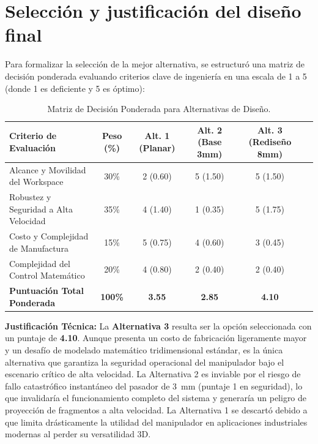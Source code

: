 \documentclass[11pt,a4paper]{article}
\begin{document}
\section{Selección y justificación del diseño final}
Para formalizar la selección de la mejor alternativa, se estructuró una matriz de decisión ponderada evaluando criterios clave de ingeniería en una escala de 1 a 5 (donde 1 es deficiente y 5 es óptimo):
\begin{table}[H]
    \centering
    \caption{Matriz de Decisión Ponderada para Alternativas de Diseño.}
    \begin{tabular}{lccccc}
        \toprule
        \textbf{Criterio de Evaluación} & \textbf{Peso (\%)} & \textbf{Alt. 1 (Planar)} & \textbf{Alt. 2 (Base 3mm)} & \textbf{Alt. 3 (Rediseño 8mm)} \\
        \midrule
        Alcance y Movilidad del Workspace & 30\% & 2 (0.60) & 5 (1.50) & 5 (1.50) \\
        Robustez y Seguridad a Alta Velocidad & 35\% & 4 (1.40) & 1 (0.35) & 5 (1.75) \\
        Costo y Complejidad de Manufactura & 15\% & 5 (0.75) & 4 (0.60) & 3 (0.45) \\
        Complejidad del Control Matemático & 20\% & 4 (0.80) & 2 (0.40) & 2 (0.40) \\
        \midrule
        \textbf{Puntuación Total Ponderada} & \textbf{100\%} & \textbf{3.55} & \textbf{2.85} & \textbf{4.10} \\
        \bottomrule
    \end{tabular}
\end{table}

\textbf{Justificación Técnica:}
La \textbf{Alternativa 3} resulta ser la opción seleccionada con un puntaje de \textbf{4.10}. Aunque presenta un costo de fabricación ligeramente mayor y un desafío de modelado matemático tridimensional estándar, es la única alternativa que garantiza la seguridad operacional del manipulador bajo el escenario crítico de alta velocidad. La Alternativa 2 es inviable por el riesgo de fallo catastrófico instantáneo del pasador de 3~mm (puntaje 1 en seguridad), lo que invalidaría el funcionamiento completo del sistema y generaría un peligro de proyección de fragmentos a alta velocidad. La Alternativa 1 se descartó debido a que limita drásticamente la utilidad del manipulador en aplicaciones industriales modernas al perder su versatilidad 3D.
\end{document}
